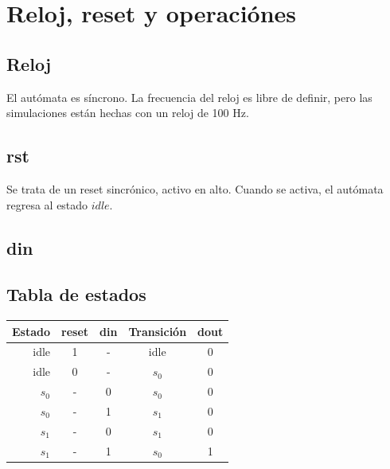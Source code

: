 \documentclass[
	12pt,
	spanish,
]{./recursos/fphw}
\begin{document}
\section{Reloj, reset y operaciónes}

\subsection{Reloj}

    El autómata es síncrono. La frecuencia del reloj es libre de definir, pero las simulaciones están hechas con un reloj de 100 Hz.

\subsection{rst}

    Se trata de un reset sincrónico, activo en alto. Cuando se activa, el autómata regresa al estado $idle$.

\subsection{din}
    \subsection*{Tabla de estados}
    \begin{center} \begin{tabular}{r || c:c || c:c }
            Estado          & reset   &  din     & Transición       & dout   \\ \hline \hline
            idle            & 1       &  -       & idle             & 0      \\ \hline
            idle            & 0       &  -       & $s_0$            & 0      \\ \hline
            $s_0$           & -       &  0       & $s_0$            & 0      \\ \hline
            $s_0$           & -       &  1       & $s_1$            & 0      \\ \hline
            $s_1$           & -       &  0       & $s_1$            & 0      \\ \hline
            $s_1$           & -       &  1       & $s_0$            & 1      \\ \hline
        \end{tabular}
        \label{tab:tabla_estados}
    \end{center}
\end{document}
